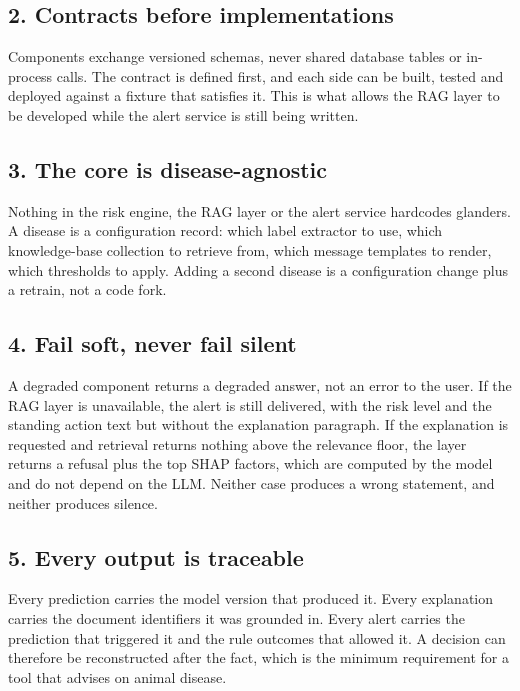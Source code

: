 \documentclass[10pt,openany]{report}
\begin{document}
\subsection*{2. Contracts before implementations}

Components exchange versioned schemas, never shared database tables or in-process calls. The
contract is defined first, and each side can be built, tested and deployed against a fixture that
satisfies it. This is what allows the RAG layer to be developed while the alert service is still
being written.

\subsection*{3. The core is disease-agnostic}

Nothing in the risk engine, the RAG layer or the alert service hardcodes glanders. A disease is a
configuration record: which label extractor to use, which knowledge-base collection to retrieve
from, which message templates to render, which thresholds to apply. Adding a second disease is a
configuration change plus a retrain, not a code fork.

\subsection*{4. Fail soft, never fail silent}

A degraded component returns a degraded answer, not an error to the user. If the RAG layer is
unavailable, the alert is still delivered, with the risk level and the standing action text but
without the explanation paragraph. If the explanation is requested and retrieval returns nothing
above the relevance floor, the layer returns a refusal plus the top SHAP factors, which are
computed by the model and do not depend on the LLM. Neither case produces a wrong statement, and
neither produces silence.

\subsection*{5. Every output is traceable}

Every prediction carries the model version that produced it. Every explanation carries the
document identifiers it was grounded in. Every alert carries the prediction that triggered it and
the rule outcomes that allowed it. A decision can therefore be reconstructed after the fact, which
is the minimum requirement for a tool that advises on animal disease.
\end{document}

